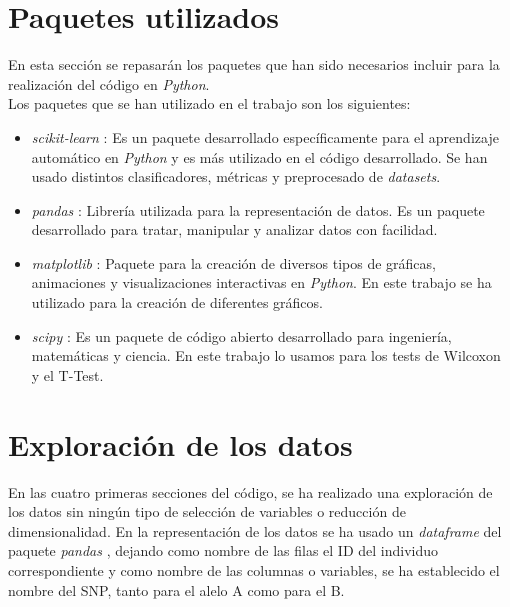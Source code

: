 \section{Paquetes utilizados}
En esta sección se repasarán los paquetes que han sido necesarios incluir para la realización del código en \textit{Python}.\\
Los paquetes que se han utilizado en el trabajo son los siguientes:
\begin{itemize}
\itemsep 0em 
  \item \textit{scikit-learn} \cite{scikit-learn}: Es un paquete desarrollado específicamente para el aprendizaje automático en \textit{Python} y es más utilizado en el código desarrollado. Se han usado distintos clasificadores, métricas y preprocesado de \textit{datasets}.
  \item \textit{pandas} \cite{mckinney-proc-scipy-2010}: Librería utilizada para la representación de datos. Es un paquete desarrollado para tratar, manipular y analizar datos con facilidad.
  \item \textit{matplotlib} \cite{Hunter:2007}: Paquete para la creación de diversos tipos de gráficas, animaciones y visualizaciones interactivas en \textit{Python}. En este trabajo se ha utilizado para la creación de diferentes gráficos.
  \item \textit{scipy} \cite{scipy}: Es un paquete de código abierto desarrollado para ingeniería, matemáticas y ciencia. En este trabajo lo usamos para los tests de Wilcoxon y el T-Test.
\end{itemize}

\section{Exploración de los datos}
En las cuatro primeras secciones del código, se ha realizado una exploración de los datos sin ningún tipo de selección de variables o reducción de dimensionalidad.
En la representación de los datos se ha usado un \textit{dataframe} del paquete \textit{pandas} \cite{mckinney-proc-scipy-2010}, dejando como nombre de las filas el ID del individuo correspondiente y como nombre de las columnas o variables, se ha establecido el nombre del SNP, tanto para el alelo A como para el B.
